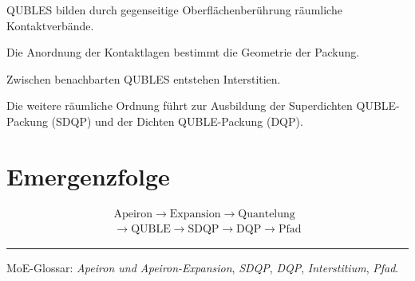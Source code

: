 \documentclass[11pt,a4paper]{article}
\begin{document}
QUBLES bilden durch gegenseitige
Oberflächenberührung räumliche
Kontaktverbände.

Die Anordnung der Kontaktlagen
bestimmt die Geometrie der Packung.

Zwischen benachbarten QUBLES
entstehen Interstitien.

Die weitere räumliche Ordnung
führt zur Ausbildung der
Superdichten QUBLE-Packung (SDQP)
und der Dichten QUBLE-Packung (DQP).

\section*{Emergenzfolge}

\[
\begin{gathered}
\text{Apeiron}
\rightarrow
\text{Expansion}
\rightarrow
\text{Quantelung}
\\[0.4em]
\rightarrow
\text{QUBLE}
\rightarrow
\text{SDQP}
\rightarrow
\text{DQP}
\rightarrow
\text{Pfad}
\end{gathered}
\]

\vspace{0.9em}
\hrule
\vspace{0.45em}

{\footnotesize
MoE-Glossar:
\emph{Apeiron und Apeiron-Expansion},
\emph{SDQP},
\emph{DQP},
\emph{Interstitium},
\emph{Pfad}.
}
\end{document}
